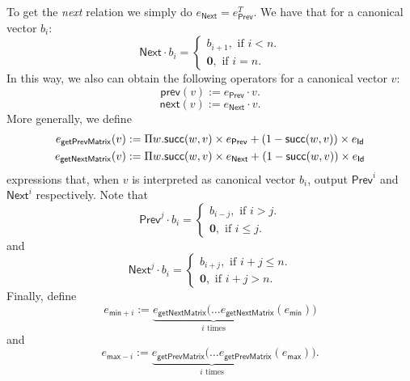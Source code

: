 To get the \textit{next} relation we simply do $e_{\mathsf{Next}} = e_{\mathsf{Prev}}^T$. We have that for a canonical vector $b_i$:
\[
{\mathsf{Next}}\cdot b_i=\begin{cases}
               b_{i+1}, \text{ if } i < n. \\
              \mathbf{0}, \text{ if } i = n.
            \end{cases}
\]
In this way, we also can obtain the following operators for a canonical vector $v$: 
$$\mathsf{prev}(v):=e_{\mathsf{Prev}}\cdot v.$$
$$\mathsf{next}(v):=e_{\mathsf{Next}}\cdot v.$$
More generally, we define 
\begin{align*}
    e_{\mathsf{getPrevMatrix}}(v)&:=\Pi w.  \mathsf{succ}(w,v)\times e_{\mathsf{Prev}} + (1 - \mathsf{succ}(w,v))\times e_{\mathsf{Id}}\\
    e_{\mathsf{getNextMatrix}}(v)&:=\Pi w. \mathsf{succ}(w,v)\times e_{\mathsf{Next}} + (1 - \mathsf{succ}(w,v))\times e_{\mathsf{Id}}
\end{align*}
expressions that, when $v$ is interpreted as canonical vector $b_i$, output $\mathsf{Prev}^i$ and $\mathsf{Next}^i$ respectively.
Note that
\[
\mathsf{Prev}^j\cdot b_i=\begin{cases}
               b_{i-j}, \text{ if } i > j. \\
              \mathbf{0}, \text{ if } i \leq j.
            \end{cases}
\]
and
\[
\mathsf{Next}^j\cdot b_i=\begin{cases}
               b_{i+j}, \text{ if } i + j \leq n. \\
              \mathbf{0}, \text{ if } i + j > n.
            \end{cases}
\]
Finally, define
$$
e_{\mathsf{min}+i}:=\underbrace{e_{\mathsf{getNextMatrix}}(\ldots e_{\mathsf{getNextMatrix}}}_{i \text{ times}}(e_{\mathsf{min}}))
$$
and
$$
e_{\mathsf{max}-i}:=\underbrace{e_{\mathsf{getPrevMatrix}}(\ldots e_{\mathsf{getPrevMatrix}}}_{i \text{ times}}(e_{\mathsf{max}})).
$$